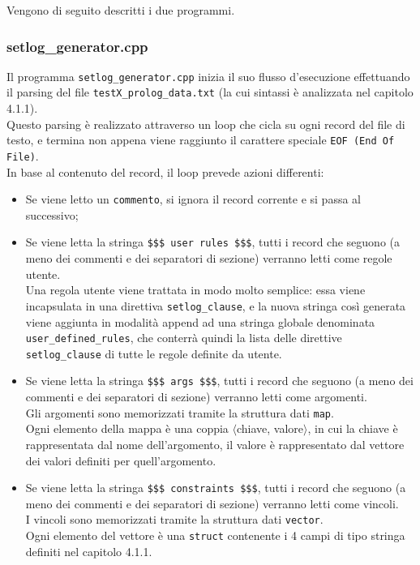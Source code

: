 Vengono di seguito descritti i due programmi.\\

\subsubsection{setlog\_generator.cpp}
Il programma \texttt{setlog\_generator.cpp} inizia il suo flusso d'esecuzione effettuando il parsing del file \texttt{testX\_prolog\_data.txt} (la cui sintassi è analizzata nel capitolo 4.1.1).\\
Questo parsing è realizzato attraverso un loop che cicla su ogni record del file di testo, e termina non appena viene raggiunto il carattere speciale \texttt{EOF (End Of File)}. \\
In base al contenuto del record, il loop prevede azioni differenti:
\begin{itemize}
\item Se viene letto un \texttt{commento}, si ignora il record corrente e si passa al successivo;

\item Se viene letta la stringa \texttt{\$\$\$ user rules \$\$\$}, tutti i record che seguono (a meno dei commenti e dei separatori di sezione) verranno letti come regole utente.\\
Una regola utente viene trattata in modo molto semplice: essa viene incapsulata in una direttiva \texttt{setlog\_clause}, e la nuova stringa così generata viene aggiunta in modalità append ad una stringa globale denominata \texttt{user\_defined\_rules}, che conterrà quindi la lista delle direttive \texttt{setlog\_clause} di tutte le regole definite da utente.

\item Se viene letta la stringa \texttt{\$\$\$ args \$\$\$}, tutti i record che seguono (a meno dei commenti e dei separatori di sezione) verranno letti come argomenti.\\
Gli argomenti sono memorizzati tramite la struttura dati \texttt{map}.\\
Ogni elemento della mappa è una coppia $\langle$chiave, valore$\rangle$, in cui la chiave è rappresentata dal nome dell'argomento, il valore è rappresentato dal vettore dei valori definiti per quell'argomento.

\item Se viene letta la stringa \texttt{\$\$\$ constraints \$\$\$}, tutti i record che seguono (a meno dei commenti e dei separatori di sezione) verranno letti come vincoli.\\
I vincoli sono memorizzati tramite la struttura dati \texttt{vector}. \\
Ogni elemento del vettore è una \texttt{struct} contenente i 4 campi di tipo stringa definiti nel capitolo 4.1.1.\\

\end{itemize}

